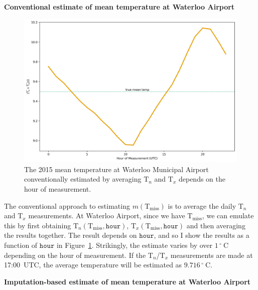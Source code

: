 \documentclass[letter]{article}
\makeatletter
\def\maxwidth{\ifdim\Gin@nat@width>\linewidth\linewidth
\else\Gin@nat@width\fi}
\let\Oldincludegraphics\includegraphics
\renewcommand{\includegraphics}[1]{\Oldincludegraphics[width=0.98\maxwidth]{#1}}
\newcommand{\genericdel}[3]{%
      \left#1#3\right#2
    }
\newcommand{\del}[1]{\genericdel(){#1}}
\newcommand{\T}{\mathrm{T}}
\newcommand{\Tn}{\T_{n}}
\newcommand{\Tx}{\T_{x}}
\newcommand{\degreeC}{{}^{\circ}~\mathrm{C}}
\newcommand{\miss}{\mathrm{miss}}
\newcommand{\hour}{\mathtt{hour}}
\newcommand{\mean}{m}
\makeatother
\begin{document}
        \textbf{Conventional estimate of mean temperature at Waterloo Airport}

\begin{figure}
\centering
\includegraphics{../figures/waterloo_mean_temp_by_hour.png}
\caption{\label{fig:waterloo_mean_temp_by_hour}The 2015 mean temperature at Waterloo Municipal Airport conventionally estimated by averaging \(\Tn\) and \(\Tx\) depends on the hour of measurement.}
\end{figure}
    


        The conventional approach to estimating \(\mean\del{\T_\miss}\) is to average the daily \(\Tn\) and \(\Tx\) measurements.
At Waterloo Airport, since we have \(\T_\miss\), we can emulate this by first obtaining \(\Tn\del{\T_\miss, \hour}\), \(\Tx\del{\T_\miss, \hour}\) and then averaging the results together.
The result depends on \(\hour\), and so I show the results as a function of \(\hour\) in Figure~\ref{fig:waterloo_mean_temp_by_hour}.
Strikingly, the estimate varies by over \(1\,\degreeC\) depending on the hour of measurement.
If the \(\Tn\)/\(\Tx\) measurements are made at 17:00~UTC, the average temperature will be estimated as \(9.716\,\degreeC\).
    


        \textbf{Imputation-based estimate of mean temperature at Waterloo Airport}
    
\end{document}
